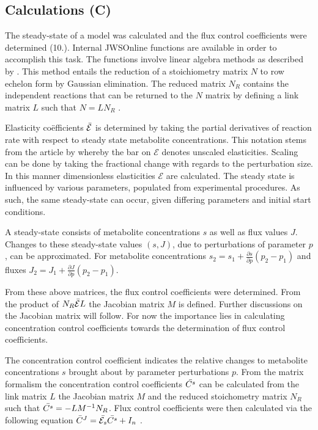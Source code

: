 \subsection{Calculations (C)} \label{Calculations}
The \gls{steady-state} of a model was calculated and the flux control coefficients were determined (10.). Internal JWSOnline functions are available in order to accomplish this task. The functions involve linear algebra methods as described by \citeauthor{Hofmeyr2001}. This method entails the reduction of a stoichiometry matrix $N$ to row echelon form by Gaussian elimination. The reduced matrix $N_R$ contains the independent reactions that can be returned to the $N$ matrix by defining a link matrix $L$ such that $N = LN_R$ \cite{Hofmeyr2001}.

Elasticity co\"efficients $\Bar{\mathcal{E}}$ is determined by taking the partial derivatives of reaction rate with respect to steady state metabolite concentrations. This notation stems from the article by \citeauthor{Hofmeyr2001} whereby the bar on $\mathcal{E}$ denotes unscaled elasticities. Scaling can be done by taking the fractional change with regards to the perturbation size. In this manner dimensionless elasticities $\mathcal{E}$ are calculated. The steady state is influenced by various parameters, populated from experimental procedures. As such, the same steady-state can occur, given differing parameters and initial start conditions.

A steady-state consists of metabolite concentrations $s$ as well as flux values $J$. Changes to these steady-state values $(s,J)$, due to perturbations of parameter $p$, can be approximated. For metabolite concentrations $s_2 = s_1 + \frac{\partial s}{\partial p}(p_2 - p_1)$ and fluxes $J_2 = J_1 + \frac{\partial J}{\partial p}(p_2 - p_1)$. 

From these  above matrices, the flux control coefficients were determined. From the product of $N_R\Bar{\mathcal{E}}L$ the Jacobian matrix $M$ is defined. Further discussions on the Jacobian matrix will follow. For now the importance lies in calculating concentration control coefficients towards the determination of flux control coefficients.

The concentration control coefficient indicates the relative changes to metabolite concentrations $s$ brought about by parameter perturbations $p$. From the matrix formalism the concentration control coefficients $\Bar{C^s}$ can be calculated from the link matrix $L$ the Jacobian matrix $M$ and the reduced stoichometry matrix $N_R$ such that $\Bar{C^s}=-LM^{-1}N_R$. Flux control coefficients were then calculated via the following equation $\Bar{C}^J = \Bar{\mathcal{E}_s}\Bar{C^s}+ I_n$ \cite{Hofmeyr2001}.


